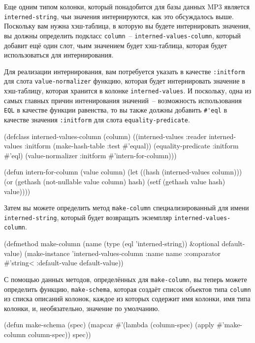 Еще одним типом колонки, который понадобится для базы данных MP3 является
\lstinline{interned-string}, чьи значения интернируются, как это обсуждалось выше.  Поскольку
вам нужна хэш-таблица, в которую вы будете интернировать значения, вы должны определить
подкласс \lstinline{column}~-- \lstinline{interned-values-column}, который добавит ещё один слот,
чьим значением будет хэш-таблица, которая будет использоваться для интернирования.

Для реализации интернирования, вам потребуется указать в качестве \lstinline{:initform} для
слота \lstinline{value-normalizer} функцию, которая будет интернировать значение в хэш-таблицу,
которая хранится в колонке \lstinline{interned-values}.  И поскольку, одна из самых главных
причин интенирования значений~-- возможность использования \lstinline{EQL} в качестве функции
равенства, то вы также должны добавить \lstinline!#'eql! в качестве значения \lstinline{:initform}
для слота \lstinline{equality-predicate}.

\begin{myverb}
(defclass interned-values-column (column)
  ((interned-values
    :reader interned-values
    :initform (make-hash-table :test #'equal))
   (equality-predicate :initform #'eql)
   (value-normalizer   :initform #'intern-for-column)))

(defun intern-for-column (value column)
  (let ((hash (interned-values column)))
    (or (gethash (not-nullable value column) hash)
        (setf (gethash value hash) value))))
\end{myverb}

Затем вы можете определить метод \lstinline{make-column} специализированный для имени
\lstinline{interned-string}, который будет возвращать экземпляр \lstinline{interned-values-column}.

\begin{myverb}
(defmethod make-column (name (type (eql 'interned-string)) &optional default-value)
  (make-instance 
   'interned-values-column
   :name name
   :comparator #'string< 
   :default-value default-value))
\end{myverb}

С помощью данных методов, определённых для \lstinline{make-column}, вы теперь можете определить
функцию, \lstinline{make-schema}, которая создаёт список объектов типа \lstinline{column} из списка
описаний колонок, каждое из которых содержит имя колонки, имя типа колонки, и,
необязательно, значение по умолчанию.

\begin{myverb}
(defun make-schema (spec)
  (mapcar #'(lambda (column-spec) (apply #'make-column column-spec)) spec))
\end{myverb}

